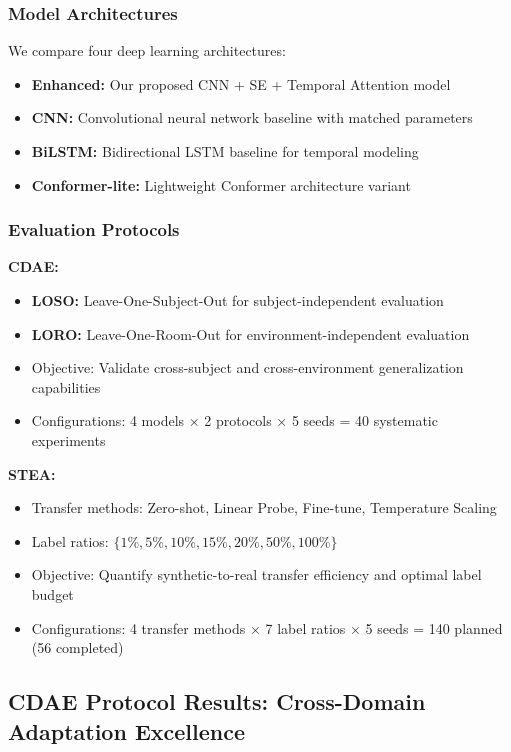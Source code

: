 \documentclass[journal]{IEEEtran}
\begin{document}
\subsubsection{Model Architectures}

We compare four deep learning architectures:
\begin{itemize}
\item \textbf{Enhanced:} Our proposed CNN + SE + Temporal Attention model
\item \textbf{CNN:} Convolutional neural network baseline with matched parameters
\item \textbf{BiLSTM:} Bidirectional LSTM baseline for temporal modeling
\item \textbf{Conformer-lite:} Lightweight Conformer architecture variant
\end{itemize}

\subsubsection{Evaluation Protocols}

\textbf{CDAE:}
\begin{itemize}
\item \textbf{LOSO:} Leave-One-Subject-Out for subject-independent evaluation
\item \textbf{LORO:} Leave-One-Room-Out for environment-independent evaluation
\item Objective: Validate cross-subject and cross-environment generalization capabilities
\item Configurations: 4 models × 2 protocols × 5 seeds = 40 systematic experiments
\end{itemize}

\textbf{STEA:}
\begin{itemize}
\item Transfer methods: Zero-shot, Linear Probe, Fine-tune, Temperature Scaling
\item Label ratios: $\{1\%, 5\%, 10\%, 15\%, 20\%, 50\%, 100\%\}$
\item Objective: Quantify synthetic-to-real transfer efficiency and optimal label budget
\item Configurations: 4 transfer methods × 7 label ratios × 5 seeds = 140 planned (56 completed)
\end{itemize}

\subsection{CDAE Protocol Results: Cross-Domain Adaptation Excellence}
\end{document}

